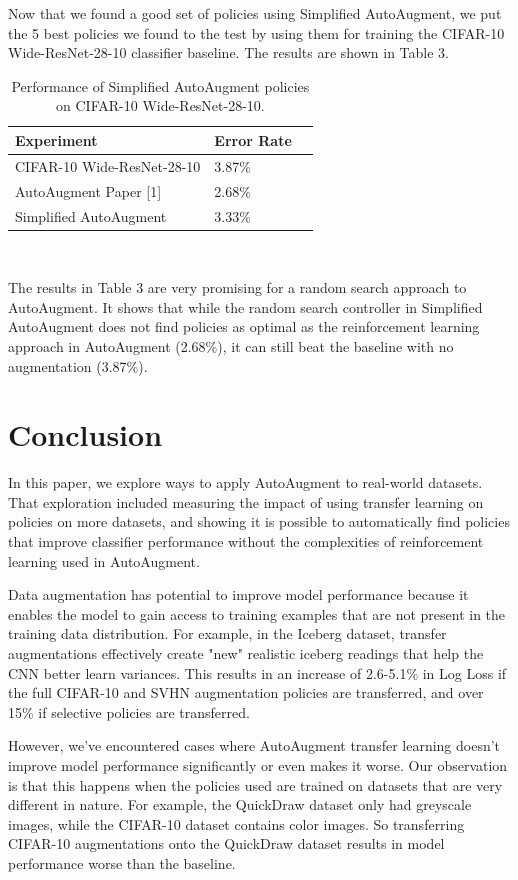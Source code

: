 \documentclass[10pt,twocolumn,letterpaper]{article}
\begin{document}
Now that we found a good set of policies using Simplified AutoAugment, we put the 5 best policies we found to the test by using them for training the CIFAR-10 Wide-ResNet-28-10 classifier baseline.  The results are shown in Table 3.

    \begin{table}[h]
      \begin{tabular}{lll}
        \hline
        Experiment &Error Rate  \\ \hline
        CIFAR-10 Wide-ResNet-28-10  &3.87\%\\
        AutoAugment Paper [1]  &2.68\% \\
        Simplified AutoAugment &3.33\%\\
        \hline
      \end{tabular}
      \\
      \caption{Performance of Simplified AutoAugment policies on CIFAR-10 Wide-ResNet-28-10.}
    \end{table}


The results in Table 3 are very promising for a random search approach to AutoAugment.  It shows that while the random search controller in Simplified AutoAugment does not find policies as optimal as the reinforcement learning approach in AutoAugment (2.68\%), it can still beat the baseline with no augmentation (3.87\%).   

\section{Conclusion}

In this paper, we explore ways to apply AutoAugment to real-world datasets. That exploration included measuring the impact of using transfer learning on policies on more datasets, and showing it is possible to automatically find policies that improve classifier performance without the complexities of reinforcement learning used in AutoAugment.

Data augmentation has potential to improve model performance because it enables the model to gain access to training examples that are not present in the training data distribution. For example, in the Iceberg dataset, transfer augmentations effectively create "new" realistic iceberg readings that help the CNN better learn variances.  This results in an increase of 2.6-5.1\% in Log Loss if the full CIFAR-10 and SVHN augmentation policies are transferred, and over 15\% if selective policies are transferred. 

However, we’ve encountered cases where AutoAugment transfer learning doesn’t improve model performance significantly or even makes it worse. Our observation is that this happens when the policies used are trained on datasets that are very different in nature. For example, the QuickDraw dataset only had greyscale images, while the CIFAR-10 dataset contains color images. So transferring CIFAR-10 augmentations onto the QuickDraw dataset results in model performance worse than the baseline.
\end{document}
